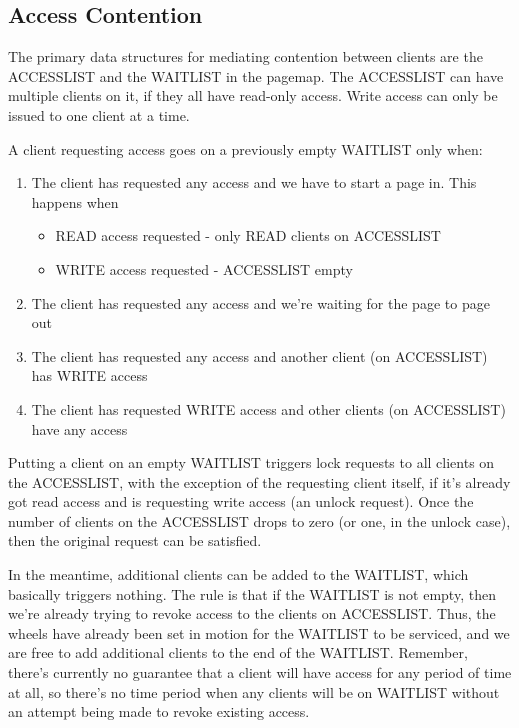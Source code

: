 \documentclass{article}
\begin{document}
\subsection{Access Contention}

The primary data structures for mediating contention between clients
are the ACCESSLIST and the WAITLIST in the pagemap.  The ACCESSLIST
can have multiple clients on it, if they all have read-only access.
Write access can only be issued to one client at a time.

A client requesting access goes on a previously empty WAITLIST only when:
\begin{enumerate}[noitemsep, itemsep=2pt, topsep=0pt]
\item The client has requested any access and we have to start a page in.  This happens when
  \begin{itemize}[label={}]
  \item READ access requested - only READ clients on ACCESSLIST
  \item WRITE access requested - ACCESSLIST empty
  \end{itemize}
\item The client has requested any access and we're waiting for the page to page out
\item The client has requested any access and another client (on ACCESSLIST) has WRITE access
\item The client has requested WRITE access and other clients (on ACCESSLIST) have any access
\end{enumerate}

Putting a client on an empty WAITLIST triggers lock requests to all
clients on the ACCESSLIST, with the exception of the requesting client
itself, if it's already got read access and is requesting write access
(an unlock request).  Once the number of clients on the ACCESSLIST
drops to zero (or one, in the unlock case), then the original request
can be satisfied.

In the meantime, additional clients can be added to the WAITLIST,
which basically triggers nothing.  The rule is that if the WAITLIST is
not empty, then we're already trying to revoke access to the clients
on ACCESSLIST.  Thus, the wheels have already been set in motion for
the WAITLIST to be serviced, and we are free to add additional clients
to the end of the WAITLIST.  Remember, there's currently no guarantee
that a client will have access for any period of time at all, so
there's no time period when any clients will be on WAITLIST without an
attempt being made to revoke existing access.
\end{document}
